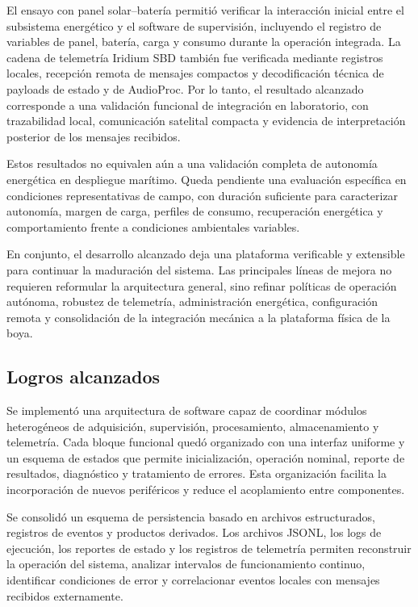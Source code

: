 El ensayo con panel solar--batería permitió verificar la interacción inicial entre el subsistema energético y el software de supervisión, incluyendo el registro de variables de panel, batería, carga y consumo durante la operación integrada. La cadena de telemetría Iridium SBD también fue verificada mediante registros locales, recepción remota de mensajes compactos y decodificación técnica de payloads de estado y de AudioProc. Por lo tanto, el resultado alcanzado corresponde a una validación funcional de integración en laboratorio, con trazabilidad local, comunicación satelital compacta y evidencia de interpretación posterior de los mensajes recibidos.

Estos resultados no equivalen aún a una validación completa de autonomía energética en despliegue marítimo. Queda pendiente una evaluación específica en condiciones representativas de campo, con duración suficiente para caracterizar autonomía, margen de carga, perfiles de consumo, recuperación energética y comportamiento frente a condiciones ambientales variables.

En conjunto, el desarrollo alcanzado deja una plataforma verificable y extensible para continuar la maduración del sistema. Las principales líneas de mejora no requieren reformular la arquitectura general, sino refinar políticas de operación autónoma, robustez de telemetría, administración energética, configuración remota y consolidación de la integración mecánica a la plataforma física de la boya.

\subsection{Logros alcanzados}

Se implementó una arquitectura de software capaz de coordinar módulos heterogéneos de adquisición, supervisión, procesamiento, almacenamiento y telemetría. Cada bloque funcional quedó organizado con una interfaz uniforme y un esquema de estados que permite inicialización, operación nominal, reporte de resultados, diagnóstico y tratamiento de errores. Esta organización facilita la incorporación de nuevos periféricos y reduce el acoplamiento entre componentes.

Se consolidó un esquema de persistencia basado en archivos estructurados, registros de eventos y productos derivados. Los archivos JSONL, los logs de ejecución, los reportes de estado y los registros de telemetría permiten reconstruir la operación del sistema, analizar intervalos de funcionamiento continuo, identificar condiciones de error y correlacionar eventos locales con mensajes recibidos externamente.


